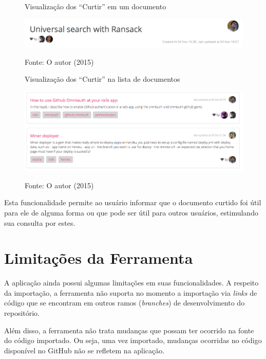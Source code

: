 \begin{figure}[h]
	\centering
    \caption{Visualização dos ``Curtir'' em um documento}
    \includegraphics[width=15cm]{Imagens/print-like-1.png}
		\label{fig:doc-like-1}
	\caption*{Fonte: O autor (2015)}
\end{figure}

\begin{figure}[h]
	\centering
    \caption{Visualização dos ``Curtir'' na lista de documentos}
    \includegraphics[width=15cm]{Imagens/print-like-2.png}
		\label{fig:doc-like-2}
	\caption*{Fonte: O autor (2015)}
\end{figure}

Esta funcionalidade permite ao usuário informar que o documento curtido foi útil para ele de alguma forma ou que pode ser útil para outros usuários, estimulando sua consulta por estes.

\section{Limitações da Ferramenta}

A aplicação ainda possui algumas limitações em suas funcionalidades. A respeito da importação, a ferramenta não suporta no momento a importação via \textit{links} de código que se encontram em outros ramos (\textit{branches}) de desenvolvimento do repositório.

Além disso, a ferramenta não trata mudanças que possam ter ocorrido na fonte do código importado. Ou seja, uma vez importado, mudanças ocorridas no código disponível no GitHub não se refletem na aplicação.

